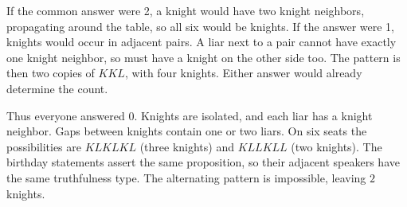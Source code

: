 If the common answer were 2, a knight would have two knight neighbors, propagating around the table, so all six would be knights. If the answer were 1, knights would occur in adjacent pairs. A liar next to a pair cannot have exactly one knight neighbor, so must have a knight on the other side too. The pattern is then two copies of $KKL$, with four knights. Either answer would already determine the count.

Thus everyone answered 0. Knights are isolated, and each liar has a knight neighbor. Gaps between knights contain one or two liars. On six seats the possibilities are $KLKLKL$ (three knights) and $KLLKLL$ (two knights). The birthday statements assert the same proposition, so their adjacent speakers have the same truthfulness type. The alternating pattern is impossible, leaving $\boxed2$ knights.

